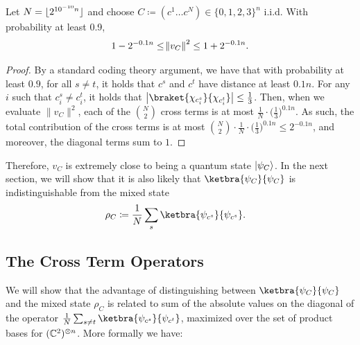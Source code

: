 \begin{lemma}\label{lem:almost state}
    Let $N={\left\lfloor \smash{2^{10^{-10}n}} \right\rfloor}$ and choose $C \coloneqq (c^1\ldots c^N )\in \{0,1,2,3\}^n$ i.i.d. With probability at least 0.9,
    \[
        1 - 2^{-0.1n} \leq \norm{v_C}^2 \leq 1 + 2^{-0.1n}.
    \]
\end{lemma}
\begin{proof}
    By a standard coding theory argument, we have that with probability at least $0.9$, for all $s\neq t$, it holds that $c^s$ and $c^t$ have distance at least $0.1n$. For any $i$ such that $c^s_i \neq c^t_i$, it holds that $\big|\braket{\smash{\chi_{c^s_i}}}{\smash{\chi_{c^t_i}}} \big| \leq \frac13$. Then, when we evaluate $\| v_C \|^2$, each of the $\binom{N}{2}$ cross terms is at most $\frac{1}{N}\cdot \big( \frac{1}{3} \big)^{0.1n}$. As such, the total contribution of the cross terms is at most $\binom{N}{2} \cdot \frac{1}{N}\cdot \big( \frac{1}{3} \big)^{0.1n} \leq 2^{-0.1n}$, and moreover, the diagonal terms sum to $1$.
\end{proof}

Therefore, $v_C$ is extremely close to being a quantum state $\lvert\psi_C\rangle$. In the next section, we will show that it is also likely that $\ketbra{\psi_C}{\psi_C}$ is indistinguishable from the mixed state
\begin{align*}
    \rho_C&\coloneq \frac1{N}\sum_{s}\ketbra{\psi_{c^s}}{\psi_{c^s}}.
\end{align*}

\subsection{The Cross Term Operators}

We will show that the advantage of distinguishing between $\ketbra{\psi_C}{\psi_C}$ and the mixed state $\rho_C$ is related to sum of the absolute values on the diagonal of the operator $\frac1{N}\sum_{s\neq t}\ketbra{\psi_{c^s}}{\psi_{c^t}}$, maximized over the set of product bases for $(\mathbb{C}^2)^{\otimes n}$. More formally we have:

